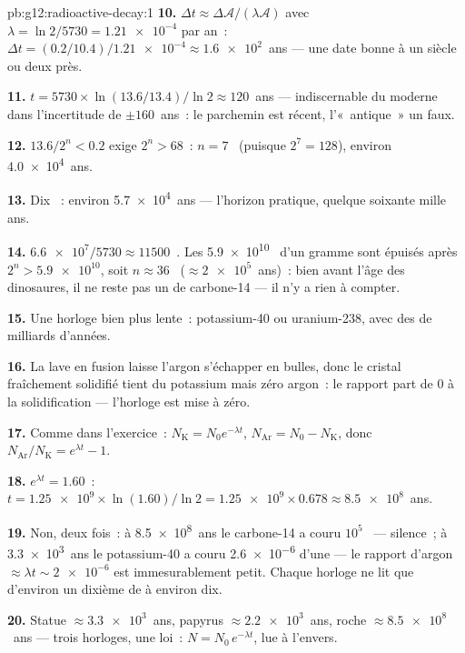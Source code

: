 \begin{solution}{pb:g12:radioactive-decay:1}
\textbf{10.} $\Delta t \approx \Delta\mathcal A/(\lambda\mathcal A)$
avec $\lambda = \ln 2/5730 = \num{1.21e-4}$ par an~:
$\Delta t = (0.2/10.4)/\num{1.21e-4} \approx \num{1.6e2}$~ans ---
une date bonne à un siècle ou deux près.

\textbf{11.} $t = \num{5730} \times \ln(13.6/13.4)/\ln 2 \approx
120$~ans --- indiscernable du moderne dans l'incertitude de
$\pm 160$~ans~: le parchemin est récent, l'«~antique~» un faux.

\textbf{12.} $13.6/2^n < 0.2$ exige $2^n > 68$~: $n = 7$~
(puisque $2^7 = 128$), environ \num{4.0e4}~ans.

\textbf{13.} Dix ~: environ \num{5.7e4}~ans --- l'horizon
pratique, quelque soixante mille ans.

\textbf{14.} $\num{6.6e7}/\num{5730} \approx \num{11500}$~.
Les \num{5.9e10}~ d'un gramme sont
épuisés après $2^n > \num{5.9e10}$, soit $n \approx 36$~
($\approx \num{2e5}$~ans)~: bien avant l'âge des dinosaures, il ne
reste pas un  de carbone-14 --- il n'y a
rien à compter.

\textbf{15.} Une horloge bien plus lente~: potassium-40 ou
uranium-238, avec des  de milliards d'années.

\textbf{16.} La lave en fusion laisse l'argon s'échapper en bulles,
donc le cristal fraîchement solidifié tient du potassium mais zéro
argon~: le rapport part de $0$ à la solidification --- l'horloge est
mise à zéro.

\textbf{17.} Comme dans l'exercice~: $N_{\mathrm K} = N_0 e^{-\lambda t}$,
$N_{\mathrm{Ar}} = N_0 - N_{\mathrm K}$, donc
$N_{\mathrm{Ar}}/N_{\mathrm K} = e^{\lambda t} - 1$.

\textbf{18.} $e^{\lambda t} = 1.60$~:
$t = \num{1.25e9} \times \ln(1.60)/\ln 2 = \num{1.25e9} \times 0.678
\approx \num{8.5e8}$~ans.

\textbf{19.} Non, deux fois~: à \num{8.5e8}~ans le carbone-14 a
couru $10^5$~ --- silence~; à \num{3.3e3}~ans le
potassium-40 a couru \num{2.6e-6} d'une
 --- le rapport d'argon
$\approx \lambda t \sim \num{2e-6}$ est immesurablement petit.
Chaque horloge ne lit que d'environ un dixième de
 à environ dix.

\textbf{20.} Statue $\approx \num{3.3e3}$~ans, papyrus
$\approx \num{2.2e3}$~ans, roche $\approx \num{8.5e8}$~ans ---
trois horloges, une loi~: $N = N_0\,e^{-\lambda t}$, lue à l'envers.
\end{solution}
